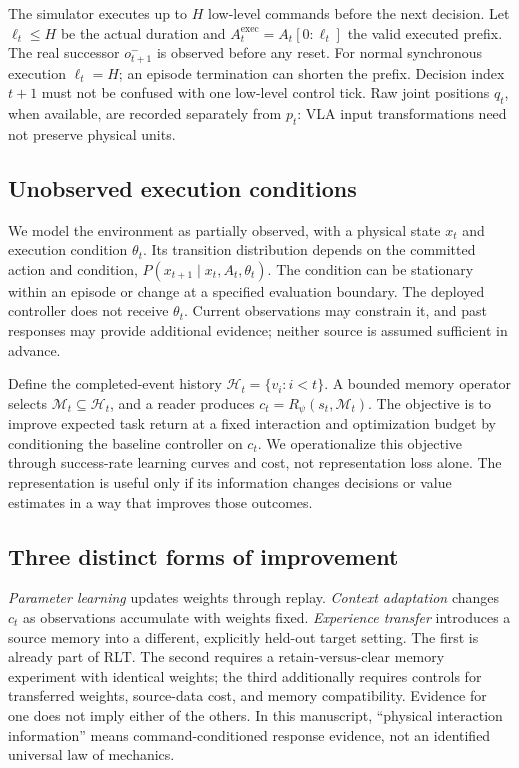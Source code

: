 \documentclass[10pt,letterpaper]{article}
\newcommand{\M}{\mathcal{M}}
\begin{document}
The simulator executes up to $H$ low-level commands before the next decision. Let $\ell_t\leq H$ be the actual duration and $A_t^{\mathrm{exec}}=A_t[0:\ell_t]$ the valid executed prefix. The real successor $o_{t+1}^{-}$ is observed before any reset. For normal synchronous execution $\ell_t=H$; an episode termination can shorten the prefix. Decision index $t+1$ must not be confused with one low-level control tick. Raw joint positions $q_t$, when available, are recorded separately from $p_t$: VLA input transformations need not preserve physical units.

\subsection{Unobserved execution conditions}
We model the environment as partially observed, with a physical state $x_t$ and execution condition $\theta_t$. Its transition distribution depends on the committed action and condition, $P(x_{t+1}\mid x_t,A_t,\theta_t)$. The condition can be stationary within an episode or change at a specified evaluation boundary. The deployed controller does not receive $\theta_t$. Current observations may constrain it, and past responses may provide additional evidence; neither source is assumed sufficient in advance.

Define the completed-event history $\mathcal{H}_t=\{v_i:i<t\}$. A bounded memory operator selects $\M_t\subseteq\mathcal{H}_t$, and a reader produces $c_t=R_\psi(s_t,\M_t)$. The objective is to improve expected task return at a fixed interaction and optimization budget by conditioning the baseline controller on $c_t$. We operationalize this objective through success-rate learning curves and cost, not representation loss alone. The representation is useful only if its information changes decisions or value estimates in a way that improves those outcomes.

\subsection{Three distinct forms of improvement}
\emph{Parameter learning} updates weights through replay. \emph{Context adaptation} changes $c_t$ as observations accumulate with weights fixed. \emph{Experience transfer} introduces a source memory into a different, explicitly held-out target setting. The first is already part of RLT. The second requires a retain-versus-clear memory experiment with identical weights; the third additionally requires controls for transferred weights, source-data cost, and memory compatibility. Evidence for one does not imply either of the others. In this manuscript, ``physical interaction information'' means command-conditioned response evidence, not an identified universal law of mechanics.
\end{document}
